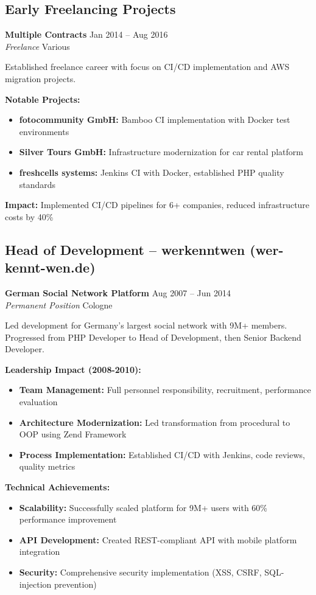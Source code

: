 \documentclass[11pt,a4paper]{article}
\newcommand{\role}[4]{\textbf{#1} \hfill #2 \\ \textit{#3} \hfill #4}
\begin{document}
\subsection{Early Freelancing Projects}
\role{Multiple Contracts}{Jan 2014 -- Aug 2016}{Freelance}{Various}

Established freelance career with focus on CI/CD implementation and AWS migration projects.

\textbf{Notable Projects:}
\begin{itemize}
\item \textbf{fotocommunity GmbH:} Bamboo CI implementation with Docker test environments
\item \textbf{Silver Tours GmbH:} Infrastructure modernization for car rental platform
\item \textbf{freshcells systems:} Jenkins CI with Docker, established PHP quality standards
\end{itemize}

\textbf{Impact:} Implemented CI/CD pipelines for 6+ companies, reduced infrastructure costs by 40\%

\subsection{Head of Development -- werkenntwen (wer-kennt-wen.de)}
\role{German Social Network Platform}{Aug 2007 -- Jun 2014}{Permanent Position}{Cologne}

Led development for Germany's largest social network with 9M+ members. Progressed from PHP Developer to Head of Development, then Senior Backend Developer.

\textbf{Leadership Impact (2008-2010):}
\begin{itemize}
\item \textbf{Team Management:} Full personnel responsibility, recruitment, performance evaluation
\item \textbf{Architecture Modernization:} Led transformation from procedural to OOP using Zend Framework
\item \textbf{Process Implementation:} Established CI/CD with Jenkins, code reviews, quality metrics
\end{itemize}

\textbf{Technical Achievements:}
\begin{itemize}
\item \textbf{Scalability:} Successfully scaled platform for 9M+ users with 60\% performance improvement
\item \textbf{API Development:} Created REST-compliant API with mobile platform integration
\item \textbf{Security:} Comprehensive security implementation (XSS, CSRF, SQL-injection prevention)
\end{itemize}
\end{document}
